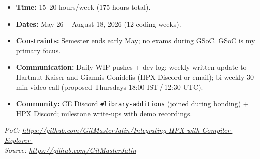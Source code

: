 \documentclass[11pt, a4paper]{article}
\newcommand{\code}[1]{\texttt{#1}}
\begin{document}
\begin{itemize}[leftmargin=2em, itemsep=2pt]
  \item \textbf{Time:} 15--20 hours/week (175 hours total).
  \item \textbf{Dates:} May 26 -- August 18, 2026 (12 coding weeks).
  \item \textbf{Constraints:} Semester ends early May; no exams during GSoC.
        GSoC is my primary focus.
  \item \textbf{Communication:} Daily WIP pushes + dev-log;
        weekly written update to Hartmut Kaiser and Giannis Gonidelis
        (HPX Discord or email); bi-weekly 30-min video call
        (proposed Thursdays 18:00 IST\,/\,12:30 UTC).
  \item \textbf{Community:} CE Discord \code{\#library-additions}
        (joined during bonding) + HPX Discord; milestone write-ups
        with demo recordings.
\end{itemize}

\vfill
\begin{center}
\small\itshape
PoC: \url{https://github.com/GitMasterJatin/Integrating-HPX-with-Compiler-Explorer-}\\
Source: \url{https://github.com/GitMasterJatin}
\end{center}
\end{document}
